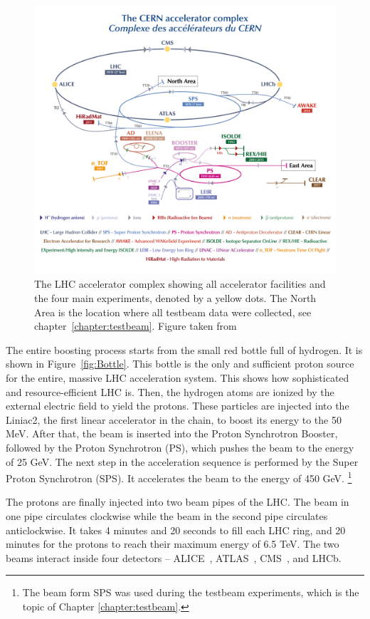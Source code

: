 \begin{figure}
\centering
\includegraphics{figures/LHC.png}
\caption{The LHC accelerator complex showing all accelerator facilities and the four main experiments, denoted by a yellow dots. The North Area is the location where all testbeam data were collected, see chapter~\ref{chapter:testbeam}. Figure taken from~\cite{LHC_complex}
\label{fig:LHC}}
\end{figure}

The entire boosting process starts from the small red bottle full of hydrogen. It is shown in Figure~\ref{fig:Bottle}. This bottle is the only and sufficient proton source for the entire, massive LHC acceleration system. This shows how sophisticated and resource-efficient LHC is. Then, the hydrogen atoms are ionized by the external electric field to yield the protons. These particles are injected into the Liniac2, the first linear accelerator in the chain, to boost its energy to the 50 MeV. After that, the beam is inserted into the Proton Synchrotron Booster, followed by the Proton Synchrotron (PS), which pushes the beam to the energy of 25 GeV. The next step in the acceleration sequence is performed by the Super Proton Synchrotron (SPS). It accelerates the beam to the energy of 450 GeV. \footnote{The beam form SPS was used during the testbeam experiments, which is the topic of Chapter \ref{chapter:testbeam}.} 

The protons are finally injected into two beam pipes of the LHC. The beam in one pipe circulates clockwise while the beam in the second pipe circulates anticlockwise. It takes 4 minutes and 20 seconds to fill each LHC ring, and 20 minutes for the protons to reach their maximum energy of 6.5 TeV. The two beams interact inside four detectors – ALICE~\cite{Alice}, ATLAS~\cite{Atlas}, CMS~\cite{CMS}, and LHCb.

